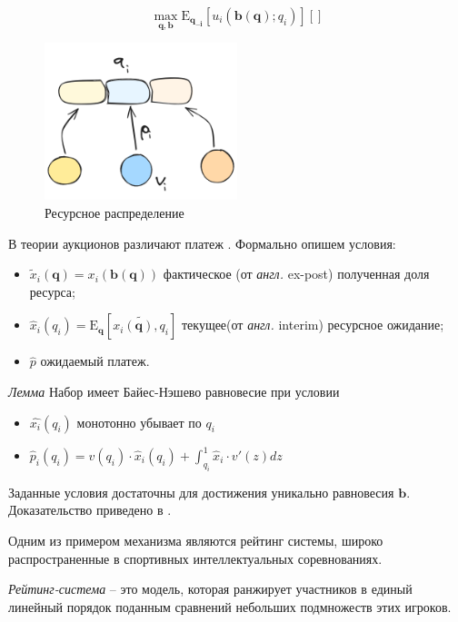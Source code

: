 \begin{equation}
    \max_{\mathbf{q},\mathbf{b}} \mathrm{E}_{\mathbf{q_{-i}}}\left[u_i(\mathbf{b}(\mathbf{q});q_i)\right] \left[\right] 
\end{equation}

\begin{figure}[h]
    \centering
    \includegraphics[width=0.5\textwidth]{assets/pedagogic/social/mech.excalidraw.png}
    \caption{Ресурсное распределение}
    \label{utility}
\end{figure}


В теории \cite{bulow1989simple} аукционов различают платеж . Формально опишем условия: \begin{itemize}
    \item $\tilde{x}_i(\mathbf{q}) = x_i(\mathbf{b}(\mathbf{q}))$ фактическое (от \textit{англ.} ex-post) полученная доля ресурса;
    \item $\hat{x}_i(q_i) = \mathrm{E}_\mathbf{q} \left[\tilde{x_i(\mathbf{q}),q_i}\right]$ текущее(от \textit{англ.} interim) ресурсное ожидание;
    \item $\hat{p}$ ожидаемый платеж.
\end{itemize}


\textit{Лемма} Набор имеет Байес-Нэшево равновесие при условии \begin{itemize}
    \item $\hat{x_i}(q_i)$ монотонно убывает по $q_i$
    \item $\hat{p}_i(q_i) = v(q_i) \cdot \hat{x}_i(q_i) + \int_{q_i}^1 \hat{x}_i \cdot v'(z) dz$
\end{itemize}
Заданные условия достаточны для достижения уникально равновесия $\mathbf{b}$. Доказательство приведено в \cite{myerson1981optimal}.


Одним из примером механизма являются рейтинг системы, широко распространенные в спортивных интеллектуальных соревнованиях.

\textit{Рейтинг-система} – это модель, которая ранжирует
участников  в единый линейный порядок поданным сравнений небольших подмножеств этих игроков.
 
